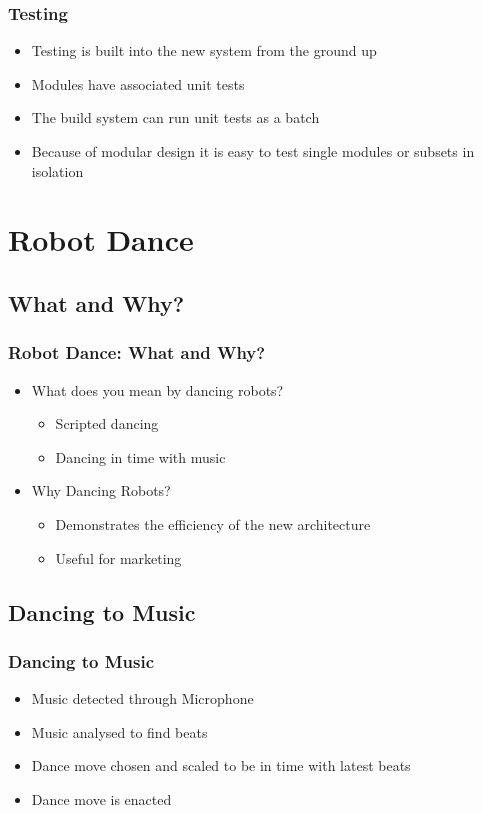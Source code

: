 \documentclass{beamer}
\begin{document}
\begin{frame}
	\frametitle{Testing}

	\begin{itemize}
		\item Testing is built into the new system from the ground up
		\item Modules have associated unit tests
		\item The build system can run unit tests as a batch
		\item Because of modular design it is easy to test single modules or subsets in isolation
	\end{itemize}
\end{frame}



\section{Robot Dance}
	\begin{frame}
		\sectionpage %
	\end{frame}
	\subsection{What and Why?} %
	\begin{frame}
		\frametitle{Robot Dance: What and Why?}
		\begin{itemize}
			\item What does you mean by dancing robots?
			\begin{itemize}
				\item Scripted dancing
				\item Dancing in time with music
			\end{itemize}
			\item Why Dancing Robots?
			\begin{itemize}
				\item Demonstrates the efficiency of the new architecture
				\item Useful for marketing
			\end{itemize}
		\end{itemize}
	\end{frame}
	\subsection{Dancing to Music} %
	\begin{frame}
		\frametitle{Dancing to Music}
		\begin{itemize}
			\item Music detected through Microphone
			\item Music analysed to find beats
			\item Dance move chosen and scaled to be in time with latest beats
			\item Dance move is enacted
		\end{itemize}
	\end{frame}	
\end{document}
